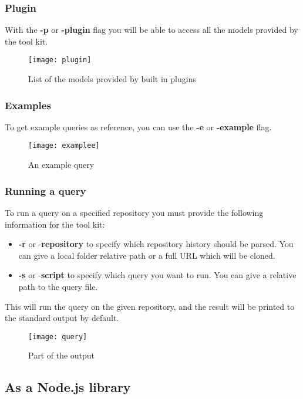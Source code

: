 \subsubsection{Plugin}
With the \textbf{-p} or \textbf{-plugin} flag you will be able to access all the models provided by the tool kit.

\begin{figure}[H]
	\centering
	\texttt{[image: plugin]}
	\caption{List of the models provided by built in plugins}
	\label{fig:fig-plugin}
\end{figure}

\subsubsection{Examples}
To get example queries as reference, you can use the \textbf{-e} or \textbf{-example} flag.

\begin{figure}[H]
	\centering
	\texttt{[image: examplee]}
	\caption{An example query}
	\label{fig:fig-example}
\end{figure}

\subsubsection{Running a query}
To run a query on a specified repository you must provide the following information for the tool kit:

\begin{itemize}
	\item \textbf{-r} or -\textbf{repository} to specify which repository history should be parsed. You can give a local folder relative path or a full URL which will be cloned.
	\item \textbf{-s} or -\textbf{script} to specify which query you want to run. You can give a relative path to the query file.
\end{itemize}

This will run the query on the given repository, and the result will be printed to the standard output by default.

\begin{figure}[H]
	\centering
	\texttt{[image: query]}
	\caption{Part of the output}
	\label{fig:fig-query}
\end{figure}


\subsection{As a Node.js library}

